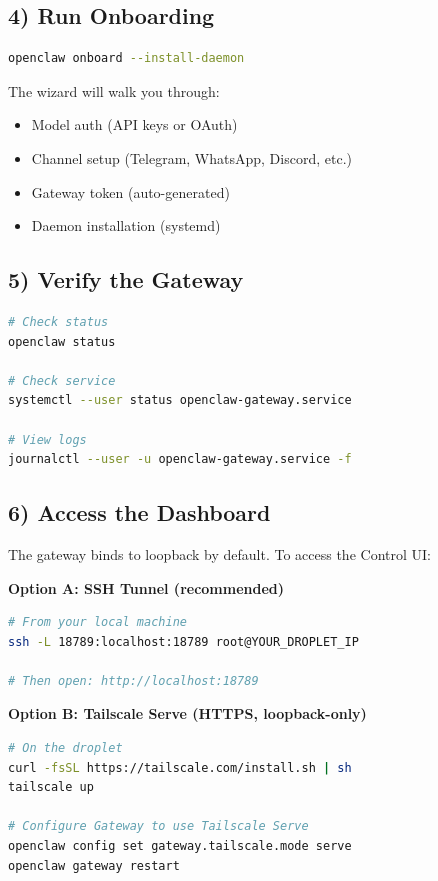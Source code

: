 \subsection{4) Run Onboarding}


\begin{lstlisting}[language=bash]
openclaw onboard --install-daemon
\end{lstlisting}


The wizard will walk you through:

\begin{itemize}
  \item Model auth (API keys or OAuth)
  \item Channel setup (Telegram, WhatsApp, Discord, etc.)
  \item Gateway token (auto-generated)
  \item Daemon installation (systemd)
\end{itemize}


\subsection{5) Verify the Gateway}


\begin{lstlisting}[language=bash]
# Check status
openclaw status

# Check service
systemctl --user status openclaw-gateway.service

# View logs
journalctl --user -u openclaw-gateway.service -f
\end{lstlisting}


\subsection{6) Access the Dashboard}


The gateway binds to loopback by default. To access the Control UI:

\textbf{Option A: SSH Tunnel (recommended)}

\begin{lstlisting}[language=bash]
# From your local machine
ssh -L 18789:localhost:18789 root@YOUR_DROPLET_IP

# Then open: http://localhost:18789
\end{lstlisting}


\textbf{Option B: Tailscale Serve (HTTPS, loopback-only)}

\begin{lstlisting}[language=bash]
# On the droplet
curl -fsSL https://tailscale.com/install.sh | sh
tailscale up

# Configure Gateway to use Tailscale Serve
openclaw config set gateway.tailscale.mode serve
openclaw gateway restart
\end{lstlisting}


